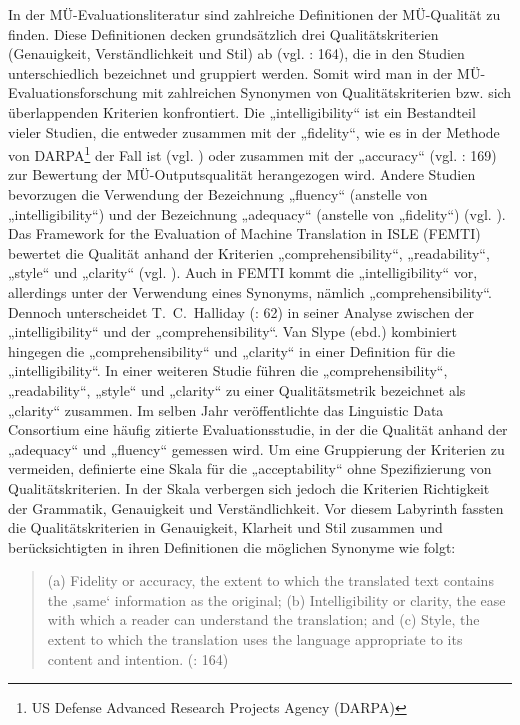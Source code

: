 In der MÜ-Evaluationsliteratur sind zahlreiche Definitionen der MÜ-Qualität zu finden. Diese Definitionen decken grundsätzlich drei Qualitätskriterien (Genauigkeit, Verständlichkeit und Stil) ab (vgl. \citealt{HutchinsSomers1992}: 164), die in den Studien unterschiedlich bezeichnet und gruppiert werden. Somit wird man in der MÜ-Evaluationsforschung mit zahlreichen Synonymen von Qualitätskriterien bzw. sich überlappenden Kriterien konfrontiert. Die „intelligibility“ ist ein Bestandteil vieler Studien, die entweder zusammen mit der „fidelity“, wie es in der Methode von DARPA\footnote{{{{US Defense Advanced Research Projects Agency (DARPA)}}}} der Fall ist (vgl. \citealt{White2003}) oder zusammen mit der „accuracy“ (vgl. \citealt{Arnold1994}: 169) zur Bewertung der MÜ-Outputsqualität herangezogen wird. Andere Studien bevorzugen die Verwendung der Bezeichnung „fluency“ (anstelle von „intelligibility“) und der Bezeichnung „adequacy“ (anstelle von „fidelity“) (vgl. \citealt{Hamon2007}). Das Framework for the Evaluation of Machine Translation in ISLE (FEMTI) bewertet die Qualität anhand der Kriterien „comprehensibility“, „readability“, „style“ und „clarity“ (vgl. \citealt{KingEtAl2003}). Auch in FEMTI kommt die „intelligibility“ vor, allerdings unter der Verwendung eines Synonyms, nämlich „comprehensibility“. Dennoch unterscheidet T.~C.~Halliday (\citealt{VanSlype1979}: 62) in seiner Analyse zwischen der „intelligibility“ und der „comprehensibility“. Van Slype (ebd.) kombiniert hingegen die „comprehensibility“ und „clarity“ in einer Definition für die „intelligibility“. In einer weiteren Studie führen \citet{VanniMiller2002} die „comprehensibility“, „readability“, „style“ und „clarity“ zu einer Qualitätsmetrik bezeichnet als „clarity“ zusammen. Im selben Jahr veröffentlichte das Linguistic Data Consortium \citep{LDC2002} eine häufig zitierte Evaluationsstudie, in der die Qualität anhand der „adequacy“ und „fluency“ gemessen wird. Um eine Gruppierung der Kriterien zu vermeiden, definierte \citet{Coughlin2003} eine Skala für die „acceptability“ ohne Spezifizierung von Qualitätskriterien. In der Skala verbergen sich jedoch die Kriterien Richtigkeit der Grammatik, Genauigkeit und Verständlichkeit. Vor diesem Labyrinth fassten \citet[164]{HutchinsSomers1992} die Qualitätskriterien in Genauigkeit, Klarheit und Stil zusammen und berücksichtigten in ihren Definitionen die möglichen Synonyme wie folgt:

\begin{quote}
(a) Fidelity or accuracy, the extent to which the translated text contains the ‚same‘ information as the original; (b) Intelligibility or clarity, the ease with which a reader can understand the translation; and (c) Style, the extent to which the translation uses the language appropriate to its content and intention. (\citealt{HutchinsSomers1992}: 164)
\end{quote}


